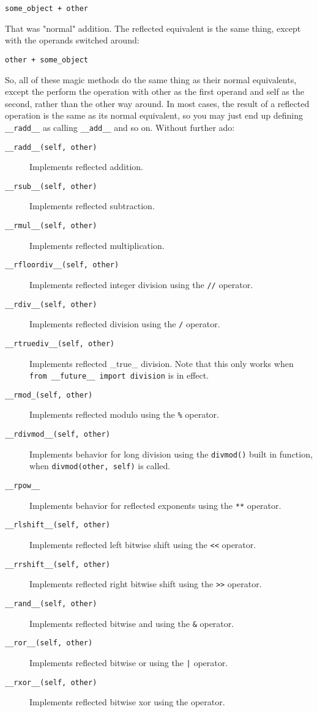 \documentclass[a4paper,11pt]{article}
\newcommand{\code}[1]{\texttt{#1}}
\begin{document}
\begin{lstlisting}
some_object + other
\end{lstlisting}

\noindent
That was "normal" addition. The reflected equivalent is the same thing, except with the operands switched around:

\begin{lstlisting}
other + some_object
\end{lstlisting}

\noindent
So, all of these magic methods do the same thing as their normal equivalents, except the perform the operation with other as the first operand and self as the second, rather than the other way around. In most cases, the result of a reflected operation is the same as its normal equivalent, so you may just end up defining \code{__radd__} as calling \code{__add__} and so on. Without further ado:

\begin{description}

\item[\code{__radd__(self, other)}]
Implements reflected addition.
\item[\code{__rsub__(self, other)}]
Implements reflected subtraction.
\item[\code{__rmul__(self, other)}]
Implements reflected multiplication.
\item[\code{__rfloordiv__(self, other)}]
Implements reflected integer division using the \code{//} operator.
\item[\code{__rdiv__(self, other)}]
Implements reflected division using the \code{/} operator.
\item[\code{__rtruediv__(self, other)}]
Implements reflected _true_ division. Note that this only works when \code{from __future__ import division} is in effect.
\item[\code{__rmod_(self, other)}]
Implements reflected modulo using the \code{\%} operator.
\item[\code{__rdivmod__(self, other)}]
Implements behavior for long division using the \code{divmod()} built in function, when \code{divmod(other, self)} is called.
\item[\code{__rpow__}]
Implements behavior for reflected exponents using the \code{**} operator.
\item[\code{__rlshift__(self, other)}]
Implements reflected left bitwise shift using the \code{<<} operator.
\item[\code{__rrshift__(self, other)}]
Implements reflected right bitwise shift using the \code{>>} operator.
\item[\code{__rand__(self, other)}]
Implements reflected bitwise and using the \code{\&} operator.
\item[\code{__ror__(self, other)}]
Implements reflected bitwise or using the \code{|} operator.
\item[\code{__rxor__(self, other)}]
Implements reflected bitwise xor using the \code{} operator.

\end{description}
\end{document}
